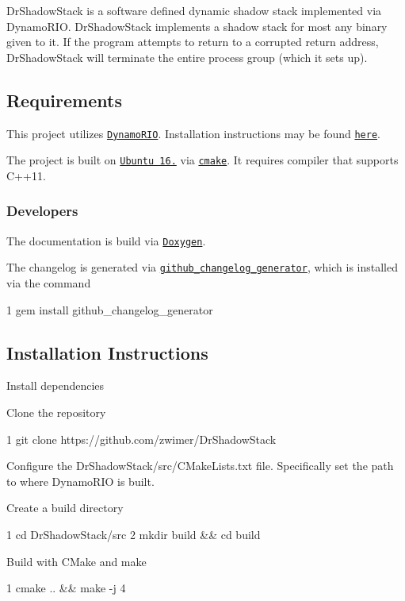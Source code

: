 Dr\+Shadow\+Stack is a software defined dynamic shadow stack implemented via Dynamo\+R\+IO. Dr\+Shadow\+Stack implements a shadow stack for most any binary given to it. If the program attempts to return to a corrupted return address, Dr\+Shadow\+Stack will terminate the entire process group (which it sets up).

\subsection*{Requirements}

This project utilizes \href{https://github.com/DynamoRIO/dynamorio}{\tt Dynamo\+R\+IO}. Installation instructions may be found \href{https://github.com/DynamoRIO/dynamorio/wiki/How-To-Build}{\tt here}.

The project is built on \href{http://releases.ubuntu.com/16.04.4/}{\tt Ubuntu 16.} via \href{https://cmake.org/}{\tt cmake}. It requires compiler that supports {\ttfamily C++11}.

\subsubsection*{Developers}

The documentation is build via \href{http://www.stack.nl/~dimitri/doxygen/}{\tt Doxygen}.

The changelog is generated via \href{https://github.com/skywinder/github-changelog-generator}{\tt github\+\_\+changelog\+\_\+generator}, which is installed via the command 
\begin{DoxyCode}
1 gem install github\_changelog\_generator
\end{DoxyCode}


\subsection*{Installation Instructions}


\begin{DoxyEnumerate}
\item Install dependencies
\item Clone the repository 
\begin{DoxyCode}
1 git clone https://github.com/zwimer/DrShadowStack
\end{DoxyCode}

\item Configure the {\ttfamily Dr\+Shadow\+Stack/src/\+C\+Make\+Lists.\+txt} file. Specifically set the path to where Dynamo\+R\+IO is built.
\item Create a build directory 
\begin{DoxyCode}
1 cd DrShadowStack/src
2 mkdir build && cd build
\end{DoxyCode}

\item Build with C\+Make and make 
\begin{DoxyCode}
1 cmake .. && make -j 4
\end{DoxyCode}

\end{DoxyEnumerate}

